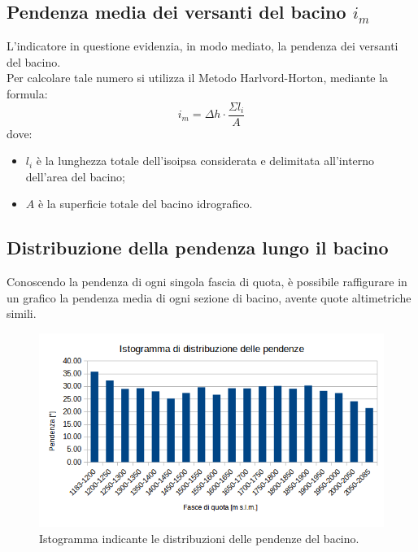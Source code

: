 \subsection{Pendenza media dei versanti del bacino $i_m$}
L'indicatore in questione evidenzia, in modo mediato, la pendenza dei versanti del bacino.\\
Per calcolare tale numero si utilizza il Metodo Harlvord-Horton, mediante la formula:
\begin{equation}
    i_m = \Delta h \cdot \frac{\Sigma l_i}{A}
\end{equation}
dove: 
\begin{itemize}
 \item $l_i$ è la lunghezza totale dell'isoipsa considerata e delimitata all'interno dell'area del bacino;
 \item $A$ è la superficie totale del bacino idrografico.
\end{itemize}

\subsection{Distribuzione della pendenza lungo il bacino}
Conoscendo la pendenza di ogni singola fascia di quota, è possibile raffigurare in un grafico la pendenza media di ogni sezione di bacino, avente quote altimetriche simili.
\begin{figure}[H] \centering
    \includegraphics[scale=0.8]{immagini/istogramma_distribuzione_pendenze.png}
    \caption{Istogramma indicante le distribuzioni delle pendenze del bacino.}
\end{figure}

